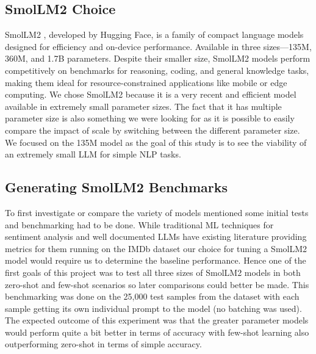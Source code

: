 \documentclass[10pt,twocolumn,letterpaper]{article}
\begin{document}
\subsection{SmolLM2 Choice}
SmolLM2 \cite{hf-SmolLM2-usecase}, developed by Hugging Face, is a family of compact language models designed for efficiency and on-device performance. Available in three sizes—135M, 360M, and 1.7B parameters. Despite their smaller size, SmolLM2 models perform competitively on benchmarks for reasoning, coding, and general knowledge tasks, making them ideal for resource-constrained applications like mobile or edge computing.
We chose SmolLM2 because it is a very recent and efficient model available in extremely small parameter sizes. The fact that it has multiple parameter size is also something we were looking for as it is possible to easily compare the impact of scale by switching between the different parameter size. We focused on the 135M model as the goal of this study is to see the viability of an extremely small LLM for simple NLP tasks. 




\subsection{Generating SmolLM2 Benchmarks}
To first investigate or compare the variety of models mentioned some initial tests and benchmarking had to be done. While traditional ML techniques for sentiment analysis and well documented LLMs have existing literature providing metrics for them running on the IMDb dataset \cite{IMDB-dataset} our choice for tuning a SmolLM2 model would require us to determine the baseline performance. Hence one of the first goals of this project was to test all three sizes of SmolLM2 models in both zero-shot and few-shot scenarios so later comparisons could better be made. This benchmarking was done on the 25,000 test samples from the dataset with each sample getting its own individual prompt to the model (no batching was used). The expected outcome of this experiment was that the greater parameter models would perform quite a bit better in terms of accuracy with few-shot learning also outperforming zero-shot in terms of simple accuracy. 
\end{document}

